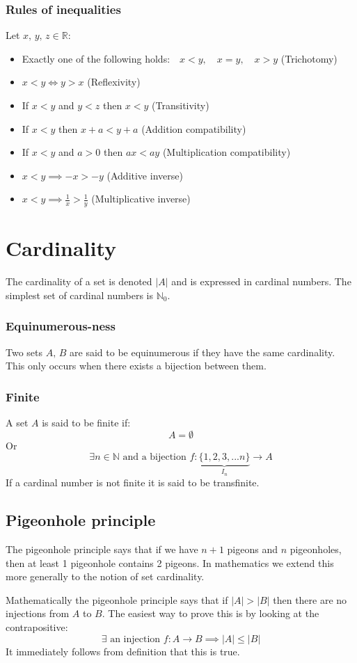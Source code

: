 \documentclass[12pt]{article}
\begin{document}
\subsubsection*{Rules of inequalities}
Let \(x,\,y,\,z\in\mathbb{R}\):
\begin{itemize}
    \item Exactly one of the following holds:\(\quad x<y,\quad x=y,\quad x>y\) (Trichotomy)
    \item \(x<y\iff y>x\) (Reflexivity)
    \item If \(x<y\) and \(y<z\) then \(x<y\) (Transitivity)
    \item If \(x<y\) then \(x+a<y+a\) (Addition compatibility)
    \item If \(x<y\) and \(a>0\) then \(ax<ay\) (Multiplication compatibility)
    \item \(x<y\implies -x>-y\) (Additive inverse)
    \item \(x<y\implies\frac{1}{x}>\frac{1}{y}\) (Multiplicative inverse)
\end{itemize}
\section{Cardinality}
The cardinality of a set is denoted \(\vert A\vert\) and is expressed in cardinal numbers. The simplest set of cardinal numbers is \(\mathbb{N}_0\).
\subsubsection*{Equinumerous-ness}
Two sets \(A,\,B\) are said to be equinumerous if they have the same cardinality. This only occurs when there exists a bijection between them.
\subsubsection*{Finite}
A set \(A\) is said to be finite if:
\[A=\emptyset\]
Or
\[\exists n\in\mathbb{N}\text{ and a bijection }f:\underbrace{\{1,2,3,...n\}}_{I_n}\to A\]
If a cardinal number is not finite it is said to be transfinite.
\subsection*{Pigeonhole principle}
The pigeonhole principle says that if we have \(n+1\) pigeons and \(n\) pigeonholes, then at least 1 pigeonhole contains 2 pigeons. In mathematics we extend this more generally to the notion of set cardinality.

Mathematically the pigeonhole principle says that if \(\vert A\vert>\vert B\vert\) then there are no injections from \(A\) to \(B\). The easiest way to prove this is by looking at the contrapositive:
\[\exists \text{ an injection } f:A\to B\implies\vert A\vert\leq\vert B\vert\]
It immediately follows from definition that this is true.
\end{document}
